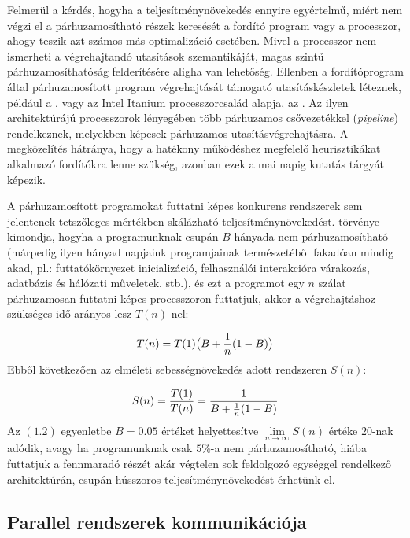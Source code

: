     Felmerül a kérdés, hogyha a teljesítménynövekedés ennyire egyértelmű, miért nem végzi el a párhuzamosítható részek keresését a fordító program vagy a processzor, ahogy teszik azt számos más optimalizáció esetében. Mivel a processzor nem ismerheti a végrehajtandó utasítások szemantikáját, magas szintű párhuzamosíthatóság felderítésére aligha van lehetőség. Ellenben a fordítóprogram által párhuzamosított program végrehajtását támogató utasításkészletek léteznek, például a \cite{VLIW}, vagy az Intel Itanium processzorcsalád alapja, az \cite{EPIC}. Az ilyen architektúrájú processzorok lényegében több párhuzamos csővezetékkel (\emph{pipeline}) rendelkeznek, melyekben képesek párhuzamos utasításvégrehajtásra. A megközelítés hátránya, hogy a hatékony működéshez megfelelő heurisztikákat alkalmazó fordítókra lenne szükség, azonban ezek a mai napig kutatás tárgyát képezik.
    
    A párhuzamosított programokat futtatni képes konkurens rendszerek sem jelentenek tetszőleges mértékben skálázható teljesítménynövekedést. \cite{Amdahl} törvénye kimondja, hogyha a programunknak csupán $B$ hányada nem párhuzamosítható (márpedig ilyen hányad napjaink programjainak természetéből fakadóan mindig akad, pl.: futtatókörnyezet inicializáció, felhasználói interakcióra várakozás, adatbázis és hálózati műveletek, stb.), és ezt a programot egy $n$ szálat párhuzamosan futtatni képes processzoron futtatjuk, akkor a végrehajtáshoz szükséges idő arányos lesz $T(n)$-nel:
    
    \begin{equation}
        T(n) = T(1)\big(B+\frac{1}{n}(1-B)\big)
    \medskip
    \end{equation}
%    
    Ebből következően az elméleti sebességnövekedés adott rendszeren $S(n)$:
    
    \begin{equation} \label{eq:amdahl}
        S(n) = \frac{T(1)}{T(n)} = \frac{1}{B+\frac{1}{n}(1-B)}
    \medskip
    \end{equation}
%
    Az $(1.2)$ egyenletbe $B = 0.05$ értéket helyettesítve $\lim\limits_{n \rightarrow \infty}{S(n)}$ értéke $20$-nak adódik, avagy ha programunknak csak $5\%$-a nem párhuzamosítható, hiába futtatjuk a fennmaradó részét akár végtelen sok feldolgozó egységgel rendelkező architektúrán, csupán hússzoros teljesítménynövekedést érhetünk el.

    \subsection{Parallel rendszerek kommunikációja} 
    \label{sec:communication_of_parallel_systems} 
        

